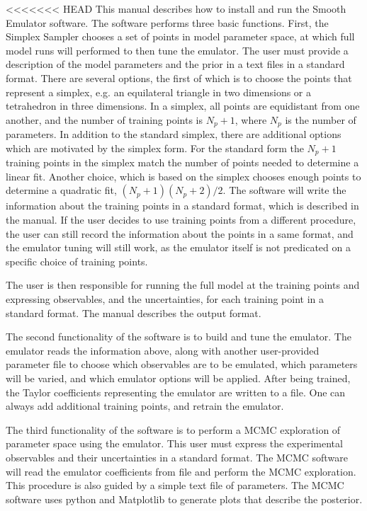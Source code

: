 \documentclass[12pt]{article}
\numberwithin{equation}{section}
\numberwithin{figure}{section}
\begin{document}
<<<<<<< HEAD
This manual describes how to install and run the Smooth Emulator software. The software performs three basic functions. First, the Simplex Sampler chooses a set of points in model parameter space, at which full model runs will performed to then tune the emulator. The user must provide a description of the model parameters and the prior in a text files in a standard format. There are several options, the first of which is to choose the points that represent a simplex, e.g. an equilateral triangle in two dimensions or a tetrahedron in three dimensions. In a simplex, all points are equidistant from one another, and the number of training points is $N_p+1$, where $N_p$ is the number of parameters. In addition to the standard simplex, there are additional options which are motivated by the simplex form. For the standard form the  $N_p+1$ training points in the simplex match the number of points needed to determine a linear fit. Another choice, which is based on the simplex chooses enough points to determine a quadratic fit, $(N_p+1)(N_p+2)/2$. The software will write the information about the training points in a standard format, which is described in the manual. If the user decides to use training points from a different procedure, the user can still record the information about the points in a same format, and the emulator tuning will still work, as the emulator itself is not predicated on a specific choice of training points.

 The user is then responsible for running the full model at the training points and expressing observables, and the uncertainties, for each training point in a standard format. The manual describes the output format.

 The second functionality of the software is to build and tune the emulator. The emulator reads the information above, along with another user-provided parameter file to choose which observables are to be emulated, which parameters will be varied, and which emulator options will be applied. After being trained, the Taylor coefficients representing the emulator are written to a file. One can always add additional training points, and retrain the emulator. 

The third functionality of the software is to perform a MCMC exploration of parameter space using the emulator. This user must express the experimental observables and their uncertainties in a standard format. The MCMC software will read the emulator coefficients from file and perform the MCMC exploration. This procedure is also guided by a simple text file of parameters. The MCMC software uses python and Matplotlib to generate plots that describe the posterior. 
\end{document}
